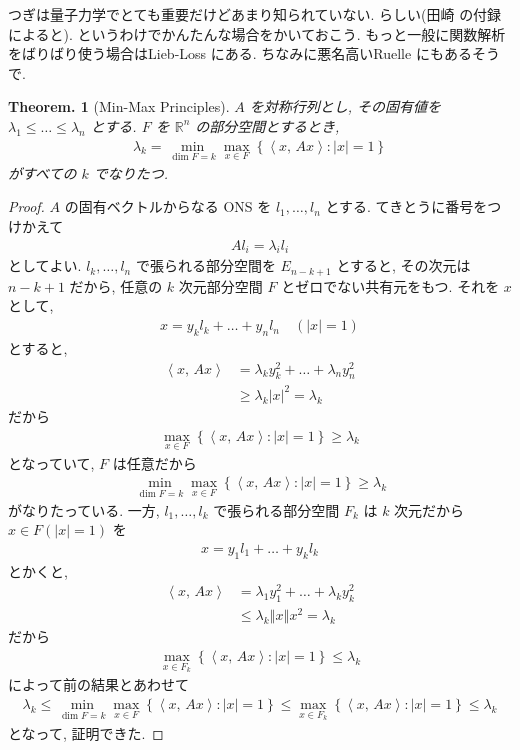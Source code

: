 \documentclass[openany, a4paper, oneside]{book}
\theoremstyle{break}
\newtheorem{thm}{Theorem.}[section]
\theoremstyle{breakdefn}
\newcommand{\abs}[1]{\left|#1\right|}
\newcommand{\norm}[1]{\left\Vert#1\right\Vert}
\newcommand{\bkt}[2]{\left\langle#1,\,#2\right\rangle}
\newcommand{\set}[2]{\left\{#1 : #2\right\}}
\begin{document}
つぎは量子力学でとても重要だけどあまり知られていない.
らしい(田崎 \cite{HalTasaki3}の付録によると).
というわけでかんたんな場合をかいておこう.
もっと一般に関数解析をばりばり使う場合はLieb-Loss \cite{LiebLoss1}にある.
ちなみに悪名高いRuelle \cite{DavidRuelle1}にもあるそうで.
\begin{thm}[Min-Max Principles]
 $A$ を対称行列とし, その固有値を $\lambda_1 \le \dots \le \lambda_n$
 とする.
 $F$ を $\mathbb{R}^n$ の部分空間とするとき,
 \begin{align}
  \lambda_k
  =
  \min_{\dim F=k} \max_{x \in F} \set{\bkt{x}{Ax}}{\abs{x} = 1}
 \end{align}
 がすべての $k$ でなりたつ.
\end{thm}
\begin{proof}
$A$ の固有ベクトルからなる ONS を $l_1, \dots , l_n$ とする.
てきとうに番号をつけかえて
\begin{align}
 Al_i
 =
 \lambda_i l_i
\end{align}
としてよい.
$l_k, \dots , l_n$ で張られる部分空間を $E_{n-k+1}$ とすると,
その次元は $n-k+1$ だから, 任意の $k$ 次元部分空間 $F$ とゼロでない共有元をもつ.
それを $x$ として,
\begin{align}
 x
 =
 y_k l_k + \dots + y_n l_n \quad (\abs{x} = 1)
\end{align}
とすると,
\begin{align}
 \bkt{x}{Ax}
 &=
 \lambda_k y_k^2 + \dots + \lambda_n y_n^2 \\
 &\ge
 \lambda_k |x|^2
 =
 \lambda_k
\end{align}
だから
\begin{align}
 \max_{x\in F } \set{\bkt{x}{Ax}}{\abs{x} = 1}
 \ge
 \lambda_k
\end{align}
となっていて, $F$ は任意だから
\begin{align}
 \min_{\dim F=k} \max_{x\in F} \set{\bkt{x}{Ax}}{\abs{x} = 1}
 \ge
 \lambda_k
\end{align}
がなりたっている.
一方, $l_1, \dots , l_k$ で張られる部分空間 $F_k$ は $k$ 次元だから $x \in F (\abs{x} = 1)$ を
\begin{align}
 x
 =
 y_1 l_1 + \dots + y_k l_k
\end{align}
とかくと,
\begin{align}
 \bkt{x}{Ax}
 &=
 \lambda_1 y_1^2 + \dots + \lambda_k y_k^2  \\
 &\le
 \lambda_k \norm{x}x^2
 =
 \lambda_k
\end{align}
だから
\begin{align}
 \max_{x \in F_k} \set{\bkt{x}{Ax}}{\abs{x} = 1}
 \le
 \lambda_k
\end{align}
によって前の結果とあわせて
\begin{align}
 \lambda_k
 \le
 \min_{\dim F=k} \max_{x \in F} \set{\bkt{x}{Ax}}{\abs{x} = 1}
 \le
 \max_{x \in F_k } \set{\bkt{x}{Ax}}{\abs{x} = 1}
 \le
 \lambda_k
\end{align}
となって, 証明できた.
\end{proof}
\end{document}
